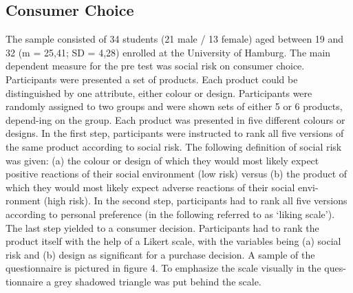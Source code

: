 \subsection{Consumer Choice}
The sample consisted of 34 students (21 male / 13 female) aged between 19 and 32 (m = 25,41; SD = 4,28) enrolled at the University of Hamburg. The main dependent measure for the pre test was social risk on consumer choice. Participants were presented a set of products. Each product could be distinguished by one attribute, either colour or design. Participants were randomly assigned to two groups and were shown sets of either 5 or 6 products, depend-ing on the group. Each product was presented in five different colours or designs. In the first step, participants were instructed to rank all five versions of the same product according to social risk. The following definition of social risk was given: (a) the colour or design of which they would most likely expect positive reactions of their social environment (low risk) versus (b) the product of which they would most likely expect adverse reactions of their social envi-ronment (high risk). In the second step, participants had to rank all five versions according to personal preference (in the following referred to as ‘liking scale’). The last step yielded to a consumer decision. Participants had to rank the product itself with the help of a Likert scale, with the variables being (a) social risk and (b) design as significant for a purchase decision. A sample of the questionnaire is pictured in figure 4. To emphasize the scale visually in the ques-tionnaire a grey shadowed triangle was put behind the scale.
 

